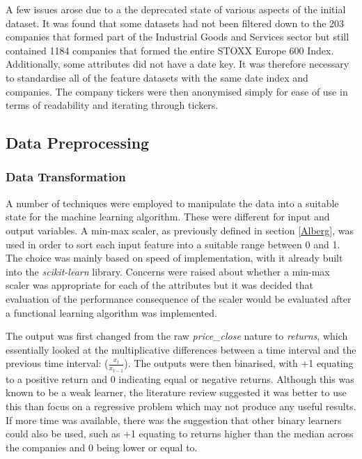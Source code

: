 \documentclass[10pt,onecolumn,letterpaper]{article}
\begin{document}
A few issues arose due to a the deprecated state of various aspects of the initial dataset. It was found that some datasets had not been filtered down to the 203 companies that formed part of the Industrial Goods and Services sector but still contained 1184 companies that formed the entire STOXX Europe 600 Index. Additionally, some attributes did not have a date key. It was therefore necessary to standardise all of the feature datasets with the same date index and companies. The company tickers were then anonymised simply for ease of use in terms of readability and iterating through tickers. 

\subsection{Data Preprocessing}

\subsubsection{Data Transformation} \label{data transformation}

A number of techniques were employed to manipulate the data into a suitable state for the machine learning algorithm. These were different for input and output variables. A min-max scaler, as previously defined in section \ref{Alberg}, was used in order to sort each input feature into a suitable range between 0 and 1. The choice was mainly based on speed of implementation, with it already built into the \textit{scikit-learn} library. Concerns were raised about whether a min-max scaler was appropriate for each of the attributes but it was decided that evaluation of the performance consequence of the scaler would be evaluated after a functional learning algorithm was implemented. 

The output was first changed from the raw \textit{price\_close} nature to \textit{returns}, which essentially looked at the multiplicative differences between a time interval and the previous time interval: ($\frac{x_{t}}{x_{t-1}}$). The outputs were then binarised, with +1 equating to a positive return and 0 indicating equal or negative returns. Although this was known to be a weak learner, the literature review suggested it was better to use this than focus on a regressive problem which may not produce any useful results. If more time was available, there was the suggestion that other binary learners could also be used, such as +1 equating to returns higher than the median across the companies and 0 being lower or equal to. 
\end{document}
